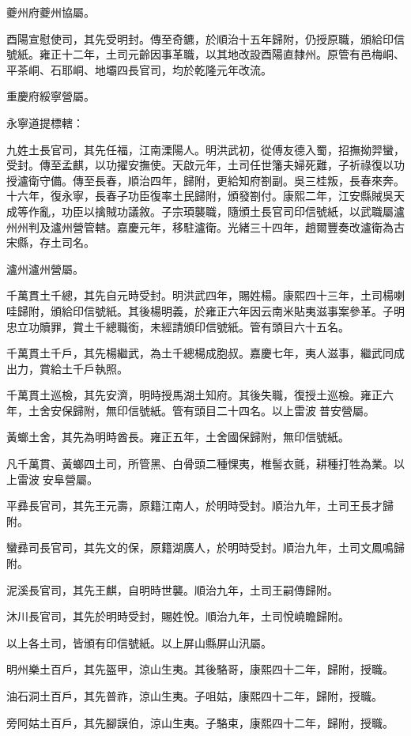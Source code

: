 \begin{pinyinscope}
夔州府夔州協屬。

酉陽宣慰使司，其先受明封。傳至奇鑣，於順治十五年歸附，仍授原職，頒給印信號紙。雍正十二年，土司元齡因事革職，以其地改設酉陽直隸州。原管有邑梅峒、平茶峒、石耶峒、地壩四長官司，均於乾隆元年改流。

重慶府綏寧營屬。

永寧道提標轄：

九姓土長官司，其先任福，江南溧陽人。明洪武初，從傅友德入蜀，招撫拗羿蠻，受封。傳至孟麒，以功擢安撫使。天啟元年，土司任世籓夫婦死難，子祈祿復以功授瀘衛守備。傳至長春，順治四年，歸附，更給知府劄副。吳三桂叛，長春來奔。十六年，復永寧，長春子功臣復率土民歸附，頒發劄付。康熙二年，江安縣賊吳天成等作亂，功臣以擒賊功議敘。子宗頊襲職，隨頒土長官司印信號紙，以武職屬瀘州州判及瀘州營管轄。嘉慶元年，移駐瀘衛。光緒三十四年，趙爾豐奏改瀘衛為古宋縣，存土司名。

瀘州瀘州營屬。

千萬貫土千總，其先自元時受封。明洪武四年，賜姓楊。康熙四十三年，土司楊喇哇歸附，頒給印信號紙。其後楊明義，於雍正六年因云南米貼夷滋事案參革。子明忠立功贖罪，賞土千總職銜，未經請頒印信號紙。管有頭目六十五名。

千萬貫土千戶，其先楊繼武，為土千總楊成胞叔。嘉慶七年，夷人滋事，繼武同成出力，賞給土千戶執照。

千萬貫土巡檢，其先安濟，明時授馬湖土知府。其後失職，復授土巡檢。雍正六年，土舍安保歸附，無印信號紙。管有頭目二十四名。以上雷波普安營屬。

黃螂土舍，其先為明時酋長。雍正五年，土舍國保歸附，無印信號紙。

凡千萬貫、黃螂四土司，所管黑、白骨頭二種惈夷，椎髻衣氈，耕種打牲為業。以上雷波安阜營屬。

平彞長官司，其先王元壽，原籍江南人，於明時受封。順治九年，土司王長才歸附。

蠻彞司長官司，其先文的保，原籍湖廣人，於明時受封。順治九年，土司文鳳鳴歸附。

泥溪長官司，其先王麒，自明時世襲。順治九年，土司王嗣傳歸附。

沐川長官司，其先於明時受封，賜姓悅。順治九年，土司悅嶢瞻歸附。

以上各土司，皆頒有印信號紙。以上屏山縣屏山汛屬。

明州樂土百戶，其先盔甲，涼山生夷。其後駱哥，康熙四十二年，歸附，授職。

油石洞土百戶，其先普祚，涼山生夷。子咀姑，康熙四十二年，歸附，授職。

旁阿姑土百戶，其先腳謨伯，涼山生夷。子駱束，康熙四十二年，歸附，授職。


\end{pinyinscope}
